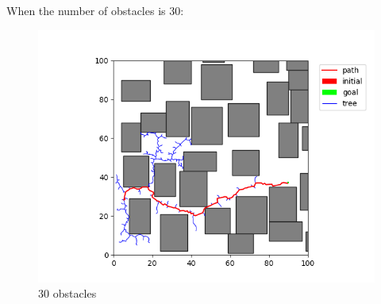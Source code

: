 \documentclass[12pt,a4paper]{article}
\begin{document}
When the number of obstacles is 30:
\begin{figure}[H]
\centering

\includegraphics[scale=.45]{30.png}
\caption{30 obstacles}
\end{figure}
\end{document}

